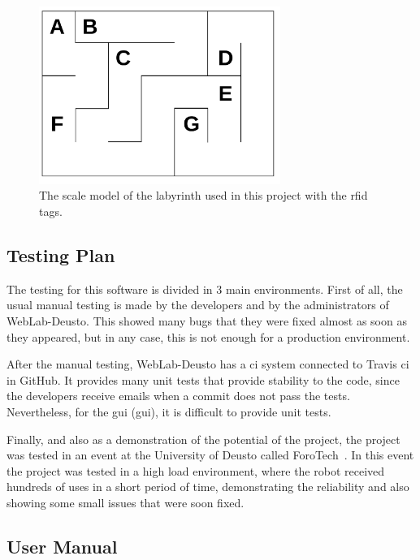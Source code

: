 \begin{figure}[!htbp]
	\centering
	\includegraphics[width=0.7\textwidth]{fig/labyrinth-diagram}
	\caption{The scale model of the labyrinth used in this project with the \acrshort{rfid} tags.}
	\label{fig:labyrinth_diagram}
\end{figure}

\subsection{Testing Plan}

The testing for this software is divided in 3 main environments. First of all, the usual manual
testing is made by the developers and by the administrators of WebLab-Deusto. This showed many bugs
that they were fixed almost as soon as they appeared, but in any case, this is not enough for a
production environment.

After the manual testing, WebLab-Deusto has a \acrlong{ci} system connected to Travis \acrshort{ci}
in GitHub. It provides many unit tests that provide stability to the code, since the developers
receive emails when a commit does not pass the tests. Nevertheless, for the \acrlong{gui}
(\acrshort{gui}), it is difficult to provide unit tests.

Finally, and also as a demonstration of the potential of the project, the project was tested in an
event at the University of Deusto called ForoTech~\cite{forotech}. In this event the project was
tested in a high load environment, where the robot received hundreds of uses in a short period of
time, demonstrating the reliability and also showing some small issues that were soon fixed.

\subsection{User Manual}

